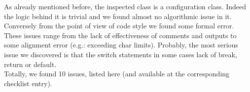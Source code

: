 As already mentioned before, the inspected class is a configuration class. Indeed the logic behind it is trivial and we found almost no algorithmic issue in it. \\
Conversely from the point of view of code style we found some formal error. These issues range from the lack of effectiveness of comments and outputs to some alignment error (e.g.: exceeding char limits).
Probably, the most serious issue we discovered is that the switch statements in some cases lack of break, return or default. \\
Totally, we found 10 issues, listed here (and available at the corresponding checklist entry).